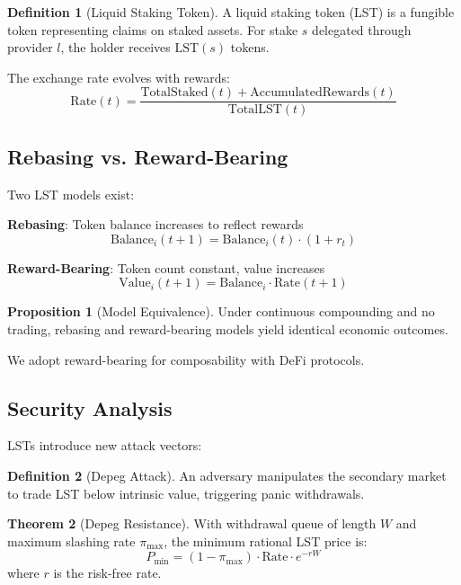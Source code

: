 \documentclass[11pt,a4paper]{article}
\theoremstyle{definition}
\newtheorem{definition}{Definition}[section]
\newtheorem{theorem}{Theorem}[section]
\newtheorem{proposition}[theorem]{Proposition}
\theoremstyle{remark}
\begin{document}
\begin{definition}[Liquid Staking Token]
A liquid staking token (LST) is a fungible token representing claims on staked assets. For stake $s$ delegated through provider $l$, the holder receives $\text{LST}(s)$ tokens.
\end{definition}

The exchange rate evolves with rewards:
\begin{equation}
    \text{Rate}(t) = \frac{\text{TotalStaked}(t) + \text{AccumulatedRewards}(t)}{\text{TotalLST}(t)}
\end{equation}

\subsection{Rebasing vs. Reward-Bearing}

Two LST models exist:

\textbf{Rebasing}: Token balance increases to reflect rewards
\begin{equation}
    \text{Balance}_i(t+1) = \text{Balance}_i(t) \cdot (1 + r_t)
\end{equation}

\textbf{Reward-Bearing}: Token count constant, value increases
\begin{equation}
    \text{Value}_i(t+1) = \text{Balance}_i \cdot \text{Rate}(t+1)
\end{equation}

\begin{proposition}[Model Equivalence]
Under continuous compounding and no trading, rebasing and reward-bearing models yield identical economic outcomes.
\end{proposition}

We adopt reward-bearing for composability with DeFi protocols.

\subsection{Security Analysis}

LSTs introduce new attack vectors:

\begin{definition}[Depeg Attack]
An adversary manipulates the secondary market to trade LST below intrinsic value, triggering panic withdrawals.
\end{definition}

\begin{theorem}[Depeg Resistance]
With withdrawal queue of length $W$ and maximum slashing rate $\pi_{\max}$, the minimum rational LST price is:
\begin{equation}
    P_{\min} = (1 - \pi_{\max}) \cdot \text{Rate} \cdot e^{-rW}
\end{equation}
where $r$ is the risk-free rate.
\end{theorem}
\end{document}
